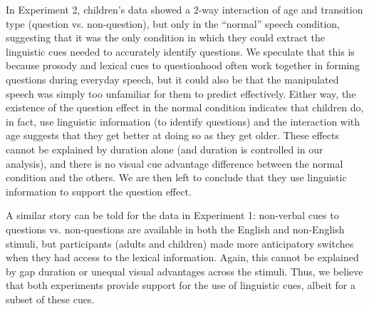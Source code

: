 \documentclass[11pt,a4paper]{letter} %
\begin{document}
\begin{letter}{}
In Experiment 2, children's data showed a 2-way interaction of age and transition type (question vs. non-question), but only in the ``normal'' speech condition, suggesting that it was the only condition in which they could extract the linguistic cues needed to accurately identify questions. We speculate that this is because prosody and lexical cues to questionhood often work together in forming questions during everyday speech, but it could also be that the manipulated speech was simply too unfamiliar for them to predict effectively. Either way, the existence of the question effect in the normal condition indicates that children do, in fact, use linguistic information (to identify questions) and the interaction with age suggests that they get better at doing so as they get older. These effects cannot be explained by duration alone (and duration is controlled in our analysis), and there is no visual cue advantage difference between the normal condition and the others. We are then left to conclude that they use linguistic information to support the question effect. 

A similar story can be told for the data in Experiment 1: non-verbal cues to questions vs. non-questions are available in both the English and non-English stimuli, but participants (adults and children) made more anticipatory switches when they had access to the lexical information. Again, this cannot be explained by gap duration or unequal visual advantages across the stimuli. Thus, we believe that both experiments provide support for the use of linguistic cues, albeit for a subset of these cues. 




\end{letter}
\end{document}
